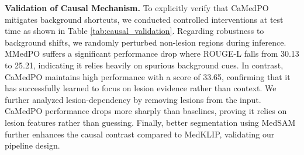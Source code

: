 \begin{table}[t]
\centering
\caption{Validation of Causal Mechanism. We evaluate robustness against distribution shifts (background swap/noise) and verify if the model truly relies on lesion features (composite input consistency). $t$ denotes the model under testing.}
\label{tab:causal_validation}
\vspace{-10pt}
\end{table}

\noindent\textbf{Validation of Causal Mechanism.} To explicitly verify that CaMedPO mitigates background shortcuts, we conducted controlled interventions at test time as shown in Table \ref{tab:causal_validation}. Regarding robustness to background shifts, we randomly perturbed non-lesion regions during inference. MMedPO suffers a significant performance drop where ROUGE-L falls from 30.13 to 25.21, indicating it relies heavily on spurious background cues. In contrast, CaMedPO maintains high performance with a score of 33.65, confirming that it has successfully learned to focus on lesion evidence rather than context. We further analyzed lesion-dependency by removing lesions from the input. CaMedPO performance drops more sharply than baselines, proving it relies on lesion features rather than guessing. Finally, better segmentation using MedSAM further enhances the causal contrast compared to MedKLIP, validating our pipeline design.

